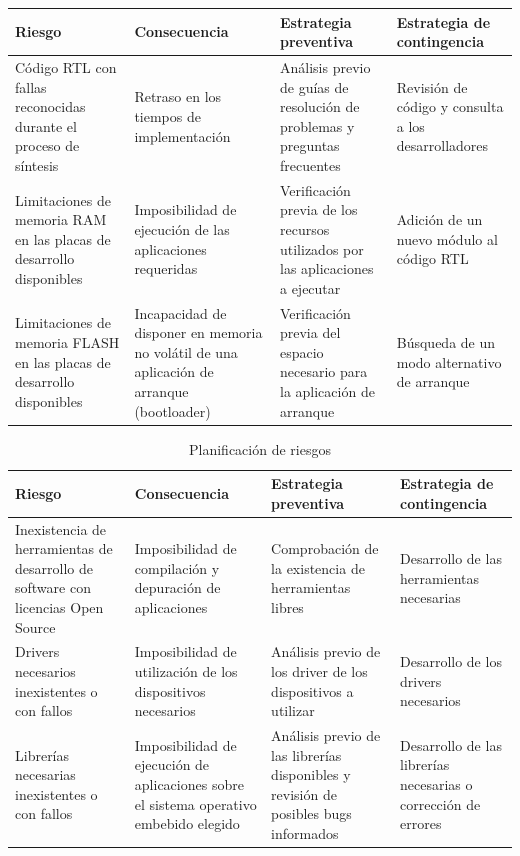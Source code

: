  \begin{table}[!h]
		\centering
		\begin{tabular}{ p{4cm} p{4cm} p{4cm} p{3cm} }
		\hline 
		\rowcolor[gray]{0.8} Riesgo & Consecuencia & Estrategia preventiva & Estrategia de contingencia\\
		\hline
		Código RTL con fallas reconocidas durante el proceso de síntesis& Retraso en los tiempos de implementación & Análisis previo de guías de resolución de problemas y preguntas frecuentes & Revisión de código y consulta a los desarrolladores \\
		
		Limitaciones de memoria RAM en las placas de desarrollo disponibles& Imposibilidad de ejecución de las aplicaciones requeridas & Verificación previa de los recursos utilizados por las aplicaciones a ejecutar & Adición de un nuevo módulo al código RTL  \\	 
		\hline
		Limitaciones de memoria FLASH en las placas de desarrollo disponibles& Incapacidad de disponer en memoria no volátil de una aplicación de arranque (bootloader) & Verificación previa del espacio necesario para la aplicación de arranque & Búsqueda de un modo alternativo de arranque\\ 
		
		\hline
		\end{tabular}
		\end{table}
		\newpage
		\begin{table}[!h]
		\centering
		\begin{tabular}{ p{4cm} p{4cm} p{4cm} p{3cm} }
		\hline 
		\rowcolor[gray]{0.8} Riesgo & Consecuencia & Estrategia preventiva & Estrategia de contingencia\\
		\hline
		Inexistencia de herramientas de desarrollo de software con licencias Open Source & Imposibilidad de compilación y depuración de aplicaciones &Comprobación de la existencia de herramientas libres & Desarrollo de las herramientas necesarias\\
		
		
		\hline
		 Drivers necesarios inexistentes o con fallos & Imposibilidad de utilización de los dispositivos necesarios&Análisis previo de los driver de los dispositivos a utilizar &  Desarrollo de los drivers necesarios\\
		\hline
		Librerías necesarias inexistentes o con fallos& Imposibilidad de ejecución de aplicaciones sobre el sistema operativo embebido elegido & Análisis previo de las librerías disponibles y revisión de posibles bugs informados &  Desarrollo de las librerías necesarias o corrección de errores\\
				
		\hline
		\end{tabular}
		\caption{Planificación de riesgos}
		\label{tab:planificación}
		\end{table}



